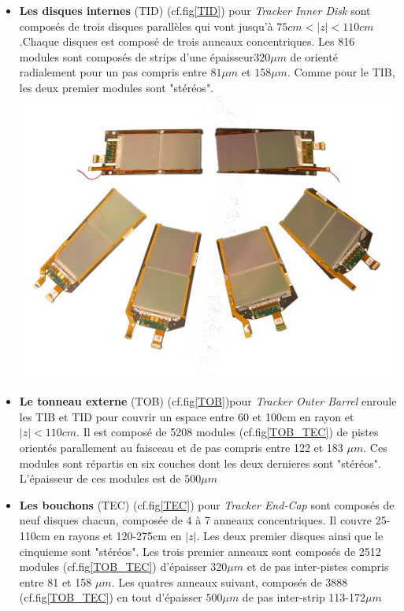 \begin{itemize}[label=$\bullet$]
\item \textbf{Les disques internes} (TID) (cf.fig\ref{TID}) pour \textit{Tracker Inner Disk} sont composés de trois disques parallèles qui vont jusqu'à $75cm<|z|<110cm$.Chaque disques est composé de trois anneaux concentriques. Les 816 modules sont composés de strips d'une épaisseur$320\mu m$ de orienté radialement pour un pas compris entre $81\mu m$ et $158\mu m$. Comme pour le TIB, les deux premier modules sont "stéréos".
\marginpar
{
	\centering
	\includegraphics[width=\marginparwidth]{CMS/TOB_TEC.png}
	\label{TOB_TEC}
}
\item \textbf{Le tonneau externe } (TOB) (cf.fig\ref{TOB})pour \textit{Tracker Outer Barrel} enroule les TIB et TID pour couvrir un espace entre 60 et 100cm en rayon et $|z|<110cm$. Il est composé de 5208 modules (cf.fig\ref{TOB_TEC}) de pistes orientés parallement au faisceau et de pas compris entre 122 et 183 $\mu m$. Ces modules sont répartis en six couches dont les deux dernieres sont "stéréos". L'épaisseur de ces modules est de $500\mu m$   

\item \textbf{Les bouchons }(TEC) (cf.fig\ref{TEC}) pour \textit{Tracker End-Cap} sont composés de neuf disques chacun, composée de 4 à 7 anneaux concentriques. Il couvre 25-110cm en rayons et 120-275cm en $|z|$. Les deux premier disques ainsi que le cinquieme sont "stéréos". Les trois premier anneaux sont composés de 2512 modules (cf.fig\ref{TOB_TEC}) d'épaisser 320$\mu m$ et de pas inter-pistes compris entre 81 et 158 $\mu m$. Les quatres anneaux suivant, composés de 3888 (cf.fig\ref{TOB_TEC}) en tout d'épaisser $500\mu m$ de pas inter-strip 113-172$\mu m$
\end{itemize}
